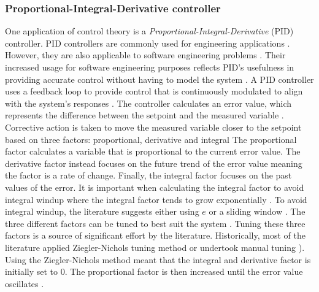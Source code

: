 \subsubsection{Proportional-Integral-Derivative controller}
One application of control theory is a
\emph{Proportional-Integral-Derivative} (PID) controller. PID controllers are
commonly used for engineering applications \cite{sariyildiz2015practical}. However, they are also applicable to software engineering
problems \cite{vick2016model}. Their increased usage for
software engineering purposes reflects PID's usefulness in providing
accurate control without having to model the system \cite{rossiter2017model}.
\newline\newline
A PID controller uses a feedback loop to provide control that is
continuously modulated to align with the system's responses \cite{litoiu2017can}. The controller calculates an error
value, which represents the difference between the setpoint and the
measured variable \cite{maxim20195w}. Corrective
action is taken to move the measured variable closer to the setpoint
based on three factors: proportional, derivative and integral \cite{rutten2017feedback}
\newline\newline
The proportional factor calculates a variable that is proportional
to the current error value. The derivative factor instead focuses on the
future trend of the error value meaning the factor is a rate of change.
Finally, the integral factor focuses on the past values of the error. It is important when calculating the integral factor to avoid integral windup where the integral factor tends to grow exponentially \cite{xue2015modeling}. To avoid integral windup, the literature suggests either using \begin{math} e \end{math} or a sliding window \cite{white2013control}.
\newline\newline
The three different factors can be tuned to best suit the system \cite{xue2015modeling}. Tuning these three factors is a source of significant effort by the
literature. Historically, most of the literature applied Ziegler-Nichols
tuning method or undertook manual tuning \cite{he2000pi}). Using
the Ziegler-Nichols method meant that the integral and derivative factor
is initially set to 0. The proportional factor is then increased until
the error value oscillates \cite{hagglund2002revisiting}.
